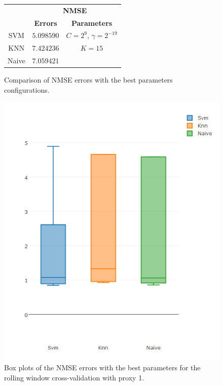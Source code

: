 \begin{figure}[!h]
\centering
\begin{tabular}{|c|c|c|}
   \hline
   & \multicolumn{2}{|c|}{\textbf{NMSE}} \\ \cline{2-3}
   & \textbf{Errors} & \textbf{Parameters}          \\ \hline
   SVM  & $5.098590$        & $C = 2^9$, $\gamma = 2^{-19}$          \\ 
   KNN & $7.424236$ & $K = 15$ \\ 
   Naive & $7.059421$ &      \\ 
   \hline
   \end{tabular}
\caption{Comparison of NMSE errors with the best parameters configurations.}
\label{fig:table6mNMSEp1}
\centering
\includegraphics[width=\linewidth]{img/6mproxy1NMSE.png}
\caption{Box plots of the NMSE errors with the best parameters for the rolling window cross-validation with proxy 1.}
\end{figure}


